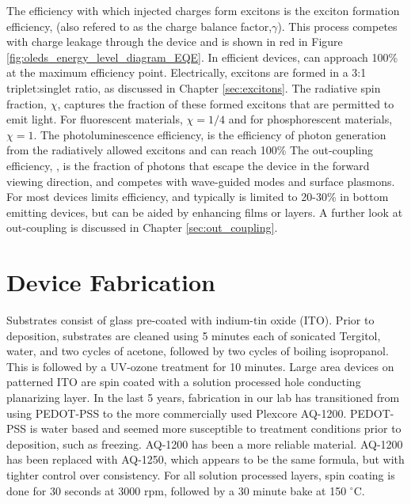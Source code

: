\documentclass[../thesis.tex]{subfiles}
\begin{document}
The efficiency with which injected charges form excitons is the exciton formation efficiency, \ef (also refered to as the charge balance factor,$\gamma$).
This process competes with charge leakage through the device and is shown in red in Figure \ref{fig:oleds_energy_level_diagram_EQE}.
In efficient devices, \ef can approach 100\% at the maximum efficiency point.
Electrically, excitons are formed in a 3:1 triplet:singlet ratio, as discussed in Chapter \ref{sec:excitons}.
The radiative spin fraction, $\chi$, captures the fraction of these formed excitons that are permitted to emit light.
For fluorescent materials, $\chi=1/4$ and for phosphorescent materials, $\chi=1$.
The photoluminescence efficiency, \pl is the efficiency of photon generation from the radiatively allowed excitons and can reach 100\%
The out-coupling efficiency, \oc, is the fraction of photons that escape the device in the forward viewing direction, and competes with wave-guided modes and surface plasmons.\supercite{Furno2010,Furno2012}
For most devices \oc limits efficiency, and typically is limited to 20-30\% in bottom emitting devices, but can be aided by enhancing films or layers.
A further look at out-coupling is discussed in Chapter \ref{sec:out_coupling}.


\section{Device Fabrication}\label{sec:oleds_fabrication}

Substrates consist of glass pre-coated with indium-tin oxide (ITO).  
Prior to deposition, substrates are cleaned using 5 minutes each of sonicated Tergitol, water, and two cycles of acetone, followed by two cycles of boiling isopropanol.  
This is followed by a UV-ozone treatment for 10 minutes.  
Large area devices on patterned ITO are spin coated with a solution processed hole conducting planarizing layer.
In the last 5 years, fabrication in our lab has transitioned from using PEDOT-PSS to the more commercially used Plexcore AQ-1200.
PEDOT-PSS is water based and seemed more susceptible to treatment conditions prior to deposition, such as freezing.
AQ-1200 has been a more reliable material.
AQ-1200 has been replaced with AQ-1250, which appears to be the same formula, but with tighter control over consistency.
For all solution processed layers, spin coating is done for 30 seconds at 3000 rpm, followed by a 30 minute bake at 150 $^\circ$C.
\end{document}
